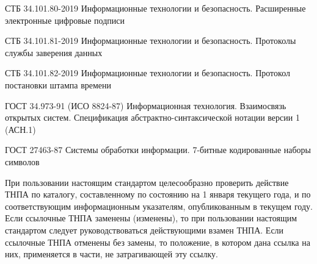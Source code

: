 СТБ 34.101.80-2019 
Информационные технологии и безопасность. 
Расширенные электронные цифровые подписи

СТБ 34.101.81-2019 
Информационные технологии и безопасность. 
Протоколы службы заверения данных

СТБ 34.101.82-2019 
Информационные технологии и безопасность. 
Протокол постановки штампа времени

ГОСТ 34.973-91 (ИСО 8824-87) Информационная технология. Взаимосвязь 
открытых систем. Спецификация абстрактно-синтаксической нотации версии 1 
(АСН.1) 

ГОСТ 27463-87 Системы обработки информации. 
7-битные кодированные наборы символов

\begin{note*}
При пользовании настоящим стандартом целесообразно проверить
действие ТНПА по каталогу, составленному по состоянию на 1 января текущего года,
и по соответствующим информационным указателям, опубликованным в текущем году.
%
Если ссылочные ТНПА заменены (изменены), то при пользовании настоящим стандартом
следует руководствоваться действующими взамен ТНПА. Если ссылочные ТНПА отменены
без замены, то положение, в котором дана ссылка на них, применяется в части, не
затрагивающей эту ссылку.
\end{note*}
